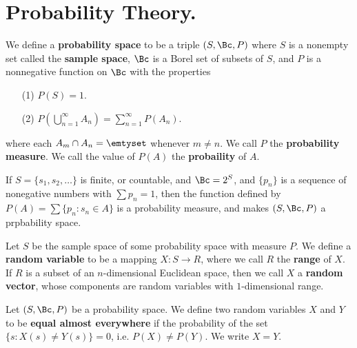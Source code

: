 
\section{Probability Theory.}
\label{section1}

\begin{definition}
    We define a \textbf{probability space} to be a triple $(S,\Bc, P)$ where
    $S$ is a nonempty set called the  \textbf{sample space}, $\Bc$ is a Borel
    set of subsets of  $S$, and  $P$ is a nonnegative function on  $\Bc$ with
    the properties
    \begin{enumerate}
        \item[(1)] $P(S)=1$.

        \item[(2)] $P(\bigcup_{n=1}^{\infty}{A_n})=\sum_{n=1}^{\infty}{P(A_n)}$.
    \end{enumerate}
    where each $A_m \cap  A_n=\emtyset$ whenever  $m \neq n$. We call  $P$ the
     \textbf{probability measure}. We call the value of $P(A)$ the
     \textbf{probaility} of $A$.
\end{definition}

\begin{example}
    If $S=\{s_1, s_2, \dots\}$ is finite, or countable, and $\Bc=2^S$, and
    $\{p_n\}$ is a sequence of nonegative numbers with $\sum{p_n}=1$, then the
    function defined by $P(A)=\sum{\{p_n : s_n \in A\}}$ is a probability
    measure, and makes $(S,\Bc, P)$ a prpbability space.
\end{example}

\begin{definition}
    Let $S$ be the sample space of some probability space with measure  $P$. We
    define a \textbf{random variable} to be a mapping $X:S \rightarrow R$, where
    we call $R$ the  \textbf{range} of $X$. If  $R$ is a subset of an
    $n$-dimensional Euclidean space, then we call $X$ a  \textbf{random vector},
    whose components are random variables with $1$-dimensional range.
\end{definition}

\begin{definition}
    Let $(S, \Bc, P)$ be a probability space. We define two random variables $X$
    and  $Y$ to be  \textbf{equal almost everywhere} if the probability of the
    set $\{s: X(s) \neq Y(s)\}=0$, i.e.  $P(X) \neq P(Y)$. We write $X=Y$.
\end{definition}

